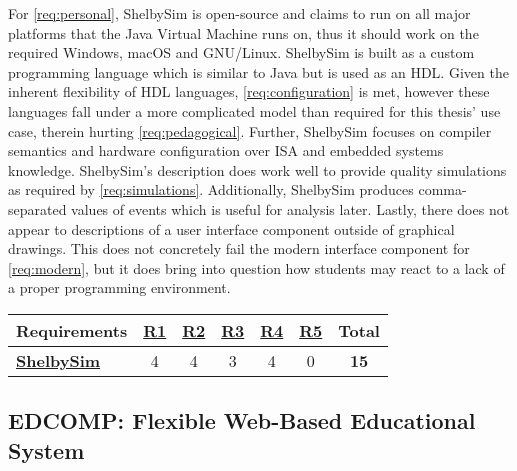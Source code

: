 For \cref{req:personal}, ShelbySim is open-source and claims to run on all major platforms that the Java Virtual Machine runs on, thus it should work on the required Windows, macOS and GNU/Linux. ShelbySim is built as a custom programming language which is similar to Java but is used as an HDL. Given the inherent flexibility of HDL languages, \cref{req:configuration} is met, however these languages fall under a more complicated model than required for this thesis' use case, therein hurting \cref{req:pedagogical}. Further, ShelbySim focuses on compiler semantics and hardware configuration over ISA and embedded systems knowledge.  ShelbySim's description does work well to provide quality simulations as required by \cref{req:simulations}. Additionally, ShelbySim produces comma-separated values of events which is useful for analysis later. Lastly, there does not appear to descriptions of a user interface component outside of graphical drawings. This does not concretely fail the modern interface component for \cref{req:modern}, but it does bring into question how students may react to a lack of a proper programming environment.

\begin{table}[h!]
    \centering
    \begin{tabular}{l|cccccc}
        \textbf{Requirements} & \textbf{\hyperref[req:personal]{R1}} & \textbf{\hyperref[req:configuration]{R2}} & \textbf{\hyperref[req:pedagogical]{R3}} & \textbf{\hyperref[req:simulations]{R4}} & \textbf{\hyperref[req:modern]{R5}} & \textbf{Total} \\ \hline
        \textbf{\hyperref[sec:review-shelbysim]{ShelbySim} \cite{Tappan2009, Tappan2009-2}} & 4                                  & 4                                    & 3                            & 4                                  & 0                             & \textbf{15}    \\
    \end{tabular}
\end{table}

\subsection{EDCOMP: Flexible Web-Based Educational System}
\label{sec:review-edcomp}

